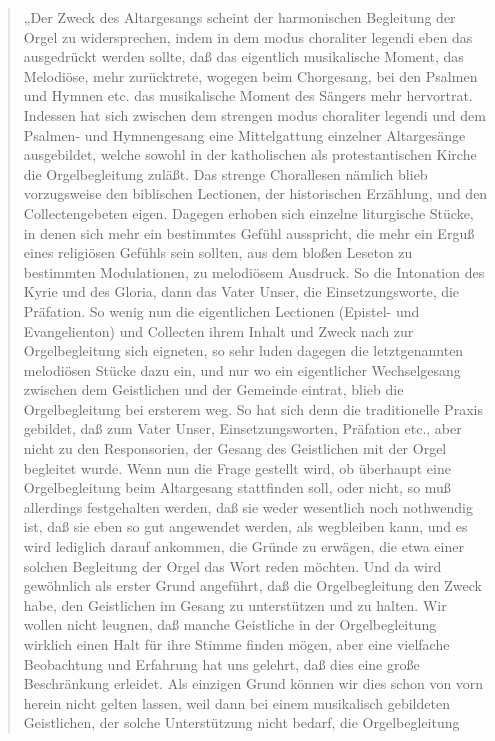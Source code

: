 \begin{quote}
„Der Zweck des Altargesangs scheint der harmonischen Begleitung der Orgel zu widersprechen, indem in dem modus choraliter legendi eben das ausgedrückt werden sollte, daß das eigentlich musikalische Moment, das Melodiöse, mehr zurücktrete, wogegen beim Chorgesang, bei den Psalmen und Hymnen etc. das musikalische Moment des Sängers mehr hervortrat. Indessen hat sich zwischen dem strengen modus choraliter legendi und dem Psalmen- und Hymnengesang eine Mittelgattung einzelner Altargesänge ausgebildet, welche sowohl in der katholischen als protestantischen Kirche die Orgelbegleitung zuläßt. Das strenge Chorallesen nämlich blieb vorzugsweise den biblischen Lectionen, der historischen Erzählung, und den Collectengebeten eigen. Dagegen erhoben sich einzelne liturgische Stücke, in denen sich mehr ein bestimmtes Gefühl ausspricht, die mehr ein Erguß eines religiösen Gefühls sein sollten, aus dem bloßen Leseton zu bestimmten Modulationen, zu melodiösem Ausdruck. So die Intonation des Kyrie und des Gloria, dann das Vater Unser, die Einsetzungsworte, die Präfation. So wenig nun die eigentlichen Lectionen (Epistel- und Evangelienton) und Collecten ihrem Inhalt und Zweck nach zur Orgelbegleitung sich eigneten, so sehr luden dagegen die letztgenannten melodiösen Stücke dazu ein, und nur wo ein eigentlicher Wechselgesang zwischen dem Geistlichen und der Gemeinde eintrat, blieb die Orgelbegleitung bei ersterem weg. So hat sich denn die traditionelle Praxis gebildet, daß zum Vater Unser, Einsetzungsworten, Präfation etc., aber nicht zu den Responsorien, der Gesang des Geistlichen mit der Orgel begleitet wurde. Wenn nun die Frage gestellt wird, ob überhaupt eine Orgelbegleitung beim Altargesang stattfinden soll, oder nicht, so muß allerdings festgehalten werden, daß sie weder wesentlich noch nothwendig ist, daß sie eben so gut angewendet werden, als wegbleiben kann, und es wird lediglich darauf ankommen, die Gründe zu erwägen, die etwa einer solchen Begleitung der Orgel das Wort reden möchten. Und da wird gewöhnlich als erster Grund angeführt, daß die Orgelbegleitung den Zweck habe, den Geistlichen im Gesang zu unterstützen und zu halten. Wir wollen nicht leugnen, daß manche Geistliche in der Orgelbegleitung wirklich einen Halt für ihre Stimme finden mögen, aber eine vielfache Beobachtung und Erfahrung hat uns gelehrt, daß dies eine große Beschränkung erleidet. Als einzigen Grund können wir dies schon von vorn herein nicht gelten lassen, weil dann bei einem musikalisch gebildeten Geistlichen, der solche Unterstützung nicht bedarf, die Orgelbegleitung

\end{quote}
